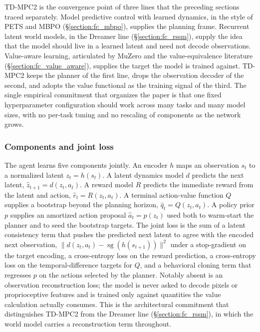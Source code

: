 TD-MPC2 \citep{Hansen2024TDMPC2} is the convergence point of three lines that the preceding sections traced separately. Model predictive control with learned dynamics, in the style of PETS and MBPO (\S\ref{section:fc_mbpo}), supplies the planning frame. Recurrent latent world models, in the Dreamer line (\S\ref{section:fc_rssm}), supply the idea that the model should live in a learned latent and need not decode observations. Value-aware learning, articulated by MuZero and the value-equivalence literature (\S\ref{section:fc_value_aware}), supplies the target the model is trained against. TD-MPC2 keeps the planner of the first line, drops the observation decoder of the second, and adopts the value functional as the training signal of the third. The single empirical commitment that organizes the paper is that one fixed hyperparameter configuration should work across many tasks and many model sizes, with no per-task tuning and no rescaling of components as the network grows.

\subsubsection{Components and joint loss}
\label{section:fc_tdmpc2_components}

The agent learns five components jointly. An encoder $h$ maps an observation $s_t$ to a normalized latent $z_t = h(s_t)$. A latent dynamics model $d$ predicts the next latent, $\hat z_{t+1} = d(z_t, a_t)$. A reward model $R$ predicts the immediate reward from the latent and action, $\hat r_t = R(z_t, a_t)$. A terminal action-value function $Q$ supplies a bootstrap beyond the planning horizon, $\hat q_t = Q(z_t, a_t)$. A policy prior $p$ supplies an amortized action proposal $\hat a_t = p(z_t)$ used both to warm-start the planner and to seed the bootstrap targets. The joint loss is the sum of a latent consistency term that pushes the predicted next latent to agree with the encoded next observation, $\| d(z_t, a_t) - \operatorname{sg}(h(s_{t+1})) \|^2$ under a stop-gradient on the target encoding, a cross-entropy loss on the reward prediction, a cross-entropy loss on the temporal-difference targets for $Q$, and a behavioral cloning term that regresses $p$ on the actions selected by the planner. Notably absent is an observation reconstruction loss; the model is never asked to decode pixels or proprioceptive features and is trained only against quantities the value calculation actually consumes. This is the architectural commitment that distinguishes TD-MPC2 from the Dreamer line (\S\ref{section:fc_rssm}), in which the world model carries a reconstruction term throughout.

